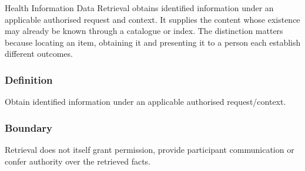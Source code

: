 Health Information Data Retrieval obtains identified information under an applicable authorised request and context. It supplies the content whose existence may already be known through a catalogue or index. The distinction matters because locating an item, obtaining it and presenting it to a person each establish different outcomes.

\subsubsection*{Definition}

Obtain identified information under an applicable authorised request/\allowbreak{}context.

\subsubsection*{Boundary}

Retrieval does not itself grant permission, provide participant communication or confer authority over the retrieved facts.

